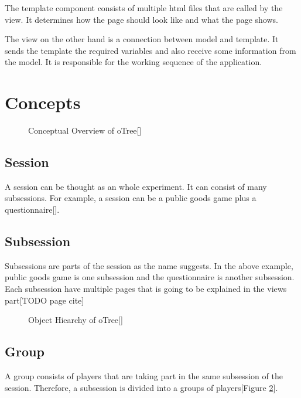 The template component consists of multiple html files that are called by the view. It determines how the page should look like and what the page shows.

The view on the other hand is a connection between model and template. It sends the template the required variables and also receive some information from the model. It is responsible for the working sequence of the application.

\section{Concepts}

\begin{figure}[h]
	\centerline{}
	\caption{Conceptual Overview of oTree[\cite{oTreeConcepts2017}]}
	\label{fig:picture3}
	
\end{figure}

\subsection{Session}

A session can be thought as an whole experiment. It can consist of many subsessions. For example, a session can be a public goods game plus a questionnaire[\cite{oTreeConcepts2017}].

\subsection{Subsession}

Subsessions are parts of the session as the name suggests. In the above example, public goods game is one subsession and the questionnaire is another subsession. Each subsession have multiple pages that is going to be explained in the views part[TODO page cite]

\begin{figure}[h]
	\centerline{}
	\caption{Object Hiearchy of oTree[\cite{oTreeConcepts2017}]}
	\label{fig:picture4}
	
\end{figure}

\subsection{Group}

A group consists of players that are taking part in the same subsession of the session. Therefore, a subsession is divided into a groups of players[Figure \ref{fig:picture4}].

